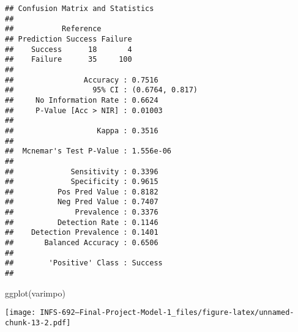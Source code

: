 \documentclass[
]{article}
\newenvironment{Shaded}{\begin{snugshade}}{\end{snugshade}}
\newcommand{\AttributeTok}[1]{\textcolor[rgb]{0.77,0.63,0.00}{#1}}
\newcommand{\FunctionTok}[1]{\textcolor[rgb]{0.00,0.00,0.00}{#1}}
\newcommand{\NormalTok}[1]{#1}
\newcommand{\OtherTok}[1]{\textcolor[rgb]{0.56,0.35,0.01}{#1}}
\newcommand{\SpecialCharTok}[1]{\textcolor[rgb]{0.00,0.00,0.00}{#1}}
\newcommand{\StringTok}[1]{\textcolor[rgb]{0.31,0.60,0.02}{#1}}
\begin{document}
\begin{Shaded}
\end{Shaded}

\begin{verbatim}
## Confusion Matrix and Statistics
## 
##           Reference
## Prediction Success Failure
##    Success      18       4
##    Failure      35     100
##                                          
##                Accuracy : 0.7516         
##                  95% CI : (0.6764, 0.817)
##     No Information Rate : 0.6624         
##     P-Value [Acc > NIR] : 0.01003        
##                                          
##                   Kappa : 0.3516         
##                                          
##  Mcnemar's Test P-Value : 1.556e-06      
##                                          
##             Sensitivity : 0.3396         
##             Specificity : 0.9615         
##          Pos Pred Value : 0.8182         
##          Neg Pred Value : 0.7407         
##              Prevalence : 0.3376         
##          Detection Rate : 0.1146         
##    Detection Prevalence : 0.1401         
##       Balanced Accuracy : 0.6506         
##                                          
##        'Positive' Class : Success        
## 
\end{verbatim}

\begin{Shaded}
\begin{Highlighting}[]
\FunctionTok{ggplot}\NormalTok{(varimpo)}
\end{Highlighting}
\end{Shaded}

\texttt{[image: INFS-692---Final-Project-Model-1\_files/figure-latex/unnamed-chunk-13-2.pdf]}
\end{document}
